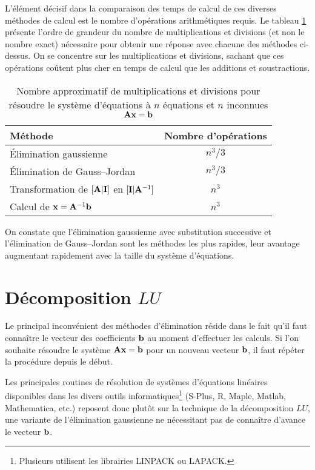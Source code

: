 L'élément décisif dans la comparaison des temps de calcul de ces
diverses méthodes de calcul est le nombre d'opérations arithmétiques
requis. Le tableau \ref{tab:decomposition:nb_oper} présente l'ordre de
grandeur du nombre de multiplications et divisions (et non le nombre
exact) nécessaire pour obtenir une réponse avec chacune des méthodes
ci-dessus. On se concentre sur les multiplications et divisions,
sachant que ces opérations coûtent plus cher en temps de calcul que
les additions et soustractions.
\begin{table}
  \centering
  \begin{tabular}{lc}
    \toprule
    Méthode & Nombre d'opérations \\
    \midrule
    Élimination gaussienne & $n^3/3$ \\
    Élimination de Gauss--Jordan & $n^3/3$ \\
    Transformation de $[\mathbf{A}|\mathbf{I}]$ en $[\mathbf{I}|\mathbf{A}^{-1}]$ &
    $n^3$ \\
    Calcul de $\mathbf{x} = \mathbf{A}^{-1} \mathbf{b}$ & $n^3$ \\
    \bottomrule
  \end{tabular}
  \caption{Nombre approximatif de multiplications et divisions pour
    résoudre le système d'équations à $n$ équations et $n$ inconnues
    $\mathbf{A} \mathbf{x} = \mathbf{b}$}
  \label{tab:decomposition:nb_oper}
\end{table}

On constate que l'élimination gaussienne avec substitution successive
et l'élimination de Gauss--Jordan sont les méthodes les plus rapides,
leur avantage augmentant rapidement avec la taille du système
d'équations.


\section{Décomposition $LU$}
\label{sec:decomposition:decomposition}

Le principal inconvénient des méthodes d'élimination réside dans le
fait qu'il faut connaître le vecteur des coefficients $\mathbf{b}$ au
moment d'effectuer les calculs. Si l'on souhaite résoudre le système
$\mathbf{Ax} = \mathbf{b}$ pour un nouveau vecteur $\mathbf{b}$, il faut
répéter la procédure depuis le début.

Les principales routines de résolution de systèmes d'équations
linéaires disponibles dans les divers outils informatiques\footnote{%
  Plusieurs utilisent les librairies LINPACK ou LAPACK.}  (S-Plus,
\textsf{R}, Maple, Matlab, Mathematica, etc.) reposent donc plutôt sur
la technique de la décomposition $LU$, une variante de l'élimination
gaussienne ne nécessitant pas de connaître d'avance le vecteur
$\mathbf{b}$.


